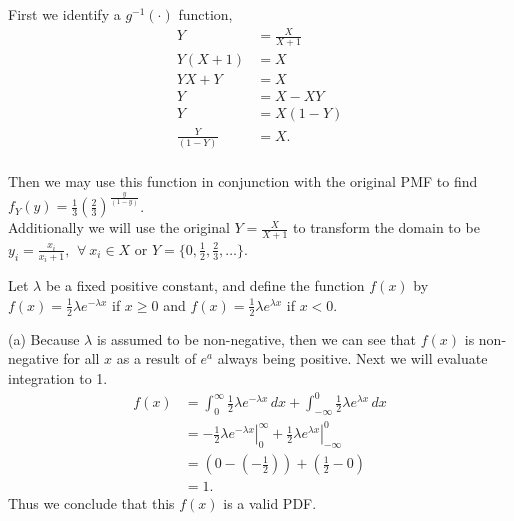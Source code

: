 \documentclass[12pt,letterpaper]{exam}
\begin{document}
\begin{questions}
	\begin{solution}
		First we identify a $g^{-1}(\cdot)$ function,
		\begin{align*}
			Y &= \frac{X}{X+1} \\
			Y(X+1) &= X \\
			YX+Y &= X \\
			Y &= X- XY \\
			Y &= X(1-Y) \\
			\frac{Y}{(1-Y)} &= X. \\
		\end{align*}
		
		Then we may use this function in conjunction with the original PMF to find
		$f_Y(y) = \frac{1}{3}\left(\frac{2}{3}\right)^\frac{y}{(1-y)}$. \\
		Additionally we will use the original ${Y} = \frac{X}{X+1}$ to transform the domain
		to be ${y_i} = \frac{x_i}{x_i+1}, \,\ \forall\ x_i\in X$ or
		$Y = \{0,\frac{1}{2},\frac{2}{3},\ldots\}$. \\
		
	\end{solution}
	\clearpage
	
	\question Let $\lambda$ be a fixed positive constant, and define the function $f(x)$ by $f(x) = \frac{1}{2} \lambda e^{-\lambda x}$ if $x \ge 0$ and $f(x) = \frac{1}{2} \lambda e^{\lambda x}$ if $x < 0$. 
	
	
	\begin{solution}
		(a)
		Because $\lambda$ is assumed to be non-negative, then we can see that $f(x)$ is non-negative for all $x$ as a result of $e^a$ always being positive.
		Next we will evaluate integration to 1.
		\begin{align*}
			f(x)
			&= \int_{0}^{\infty} \frac{1}{2}\lambda e^{-\lambda x} \,dx + \int_{-\infty}^{0} \frac{1}{2}\lambda e^{\lambda x} \,dx \\
			&= \left. -\frac{1}{2}\lambda e^{-\lambda x} \right|_{0}^{\infty} + \left. \frac{1}{2}\lambda e^{\lambda x} \right|_{-\infty}^{0} \\
			&= (0-(-\frac{1}{2})) + (\frac{1}{2} - 0) \\
			&= 1.
		\end{align*}
		Thus we conclude that this $f(x)$ is a valid PDF.
		

\end{solution}
\end{questions}
\end{document}
